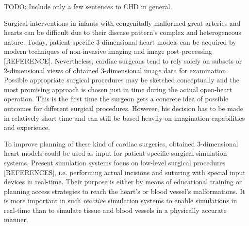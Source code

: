 TODO: Include only a few sentences to CHD in general.

Surgical interventions in infants with congenitally malformed great arteries and hearts can be difficult due to their disease pattern's complex and heterogeneous nature. Today, patient-specific 3-dimensional heart models can be acquired by modern techniques of non-invasive imaging and image post-processing [REFERENCE]. Nevertheless, cardiac surgeons tend to rely solely on subsets or 2-dimensional views of obtained 3-dimensional image data for examination. Possible appropriate surgical procedures may be sketched conceptually and the most promising approach is chosen just in time during the actual open-heart operation. This is the first time the surgeon gets a concrete idea of possible outcomes for different surgical procedures. However, his decision has to be made in relatively short time and can still be based heavily on imagination capabilities and experience.

To improve planning of these kind of cardiac surgeries, obtained 3-dimensional heart models could be used as input for patient-specific surgical simulation systems. Present simulation systems focus on low-level surgical procedures [REFERENCES], i.e. performing actual incisions and suturing with special input devices in real-time. Their purpose is either by means of educational training or planning access strategies to reach the heart's or blood vessel's malformations. It is more important in such \emph{reactive} simulation systems to enable simulations in real-time than to simulate tissue and blood vessels in a physically accurate manner. 

